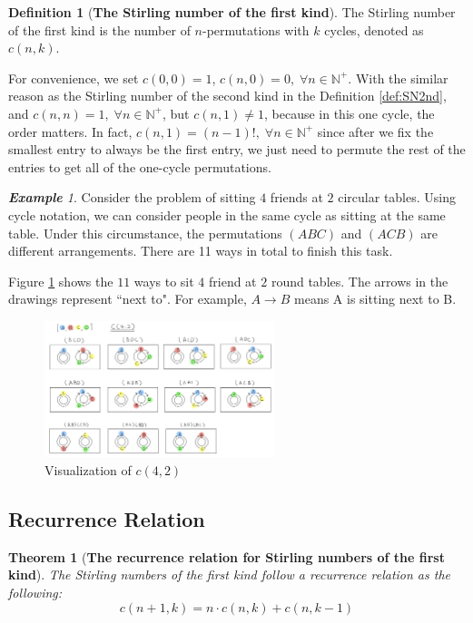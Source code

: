 \documentclass{article}
\newtheorem{theorem}{Theorem}[section]
\theoremstyle{definition}
\newtheorem{definition}{Definition}[section]
\theoremstyle{remark}
\theoremstyle{example}
\newtheorem{example}{\textbf{Example}}[section]
\begin{document}
\begin{definition}[\textbf{The Stirling number of the first kind}]\label{def:SN1st}
    The Stirling number of the first kind is the number of $n$-permutations with $k$ cycles, denoted as $c(n,k)$.
\end{definition}

For convenience, we set $c(0,0) = 1$, $c(n,0) = 0, \; \forall n \in \mathbb{N^{+}}$. With the similar reason as the Stirling number of the second kind in the Definition \ref{def:SN2nd}, and $c(n,n) = 1, \; \forall n \in \mathbb{N^{+}}$, but $c(n,1) \neq 1$, because in this one cycle, the order matters. In fact, $c(n,1) = (n-1)!,\; \forall n \in \mathbb{N^{+}}$ since after we fix the smallest entry to always be the first entry, we just need to permute the rest of the entries to get all of the one-cycle permutations.

\begin{example} \label{ex:c(4,2)}
Consider the problem of sitting $4$ friends at $2$ circular tables. Using cycle notation, we can consider people in the same cycle as sitting at the same table. Under this circumstance, the permutations $(ABC)$ and $(ACB)$ are different arrangements. There are 11 ways in total to finish this task.

Figure \ref{vis:V1} shows the $11$ ways to sit $4$ friend at $2$ round tables. The arrows in the drawings represent ``next to". For example, $A \rightarrow B$ means A is sitting next to B.

\begin{figure}[H]
\centering
\includegraphics[width=0.6\textwidth]{Visualization1.jpeg}
\caption{\label{vis:V1}Visualization of $c(4,2)$}
\end{figure}
\end{example}

\subsection{Recurrence Relation}\label{sec:4.2}
\begin{theorem}[\textbf{The recurrence relation for Stirling numbers of the first kind}]\label{thm:RR1st}
    The Stirling numbers of the first kind follow a recurrence relation as the following:
    \begin{equation}\label{eqn:RR1st}
        c(n+1,k) = n\cdot c(n,k) + c(n,k-1)
    \end{equation}
\end{theorem}
\end{document}

